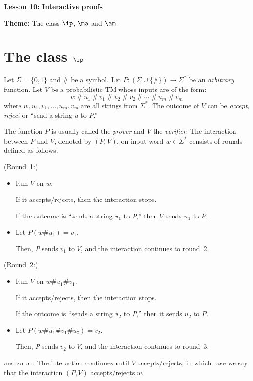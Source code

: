 \documentclass[11pt, a4paper]{article}
\renewcommand{\lesson}{10}
\renewcommand{\lessontitle}{Interactive proofs}
\renewcommand{\fulltitle}{Lesson \lesson: \lessontitle}
\begin{document}
\date{}



\begin{center}
{\Large {\bf \fulltitle}}
\end{center}
\vspace{0.5cm}

\noindent
{\bf Theme:} The class $\ip$, $\ma$ and $\am$.

\section{The class $\ip$}

Let $\Sigma=\{0,1\}$ and $\#$ be a symbol.
Let $P:(\Sigma\cup\{\#\})\to\Sigma^*$ be an {\em arbitrary} function.
Let $V$ be a probabilistic TM whose inputs are of the form:
$$
w\ \#\ u_1\ \#\ v_1\ \#\ u_2\ \# \ v_2\ \#\ \cdots \ \# \ u_{m}\ \# \ v_{m} 
$$
where $w,u_1,v_1,\ldots,u_m,v_m$ are all strings from $\Sigma^*$.
The outcome of $V$ can be {\em accept}, {\em reject} or ``send a string $u$ to $P$.''

The function $P$ is usually called the {\em prover} and $V$ the {\em verifier}.
The interaction between $P$ and $V$, denoted by $(P,V)$, on input word $w\in \Sigma^*$ consists of rounds defined as follows.

\vspace{0.3cm}
\noindent
(Round~1:)
\begin{itemize}
\item
Run $V$ on $w$.

If it accepts/rejects, then the interaction stops.

If the outcome is ``sends a string $u_1$ to $P$,''
then $V$ sends $u_1$ to $P$.

\item 
Let $P(w\#u_1)=v_1$.

Then, $P$ sends $v_1$ to $V$, and the interaction continues to round~2.
\end{itemize}
(Round~2:)
\begin{itemize}
\item
Run $V$ on $w\#u_1\#v_1$.

If it accepts/rejects, then the interaction stops.

If the outcome is ``sends a string $u_2$ to $P$,''
then it sends $u_2$ to $P$.

\item 
Let $P(w\#u_1\#v_1\#u_2)=v_2$.

Then, $P$ sends $v_2$ to $V$, and the interaction continues to round~3.
\end{itemize}
and so on. The interaction continues until $V$ accepts/rejects, in which case
we say that the interaction $(P,V)$ accepts/rejects $w$.
\end{document}
